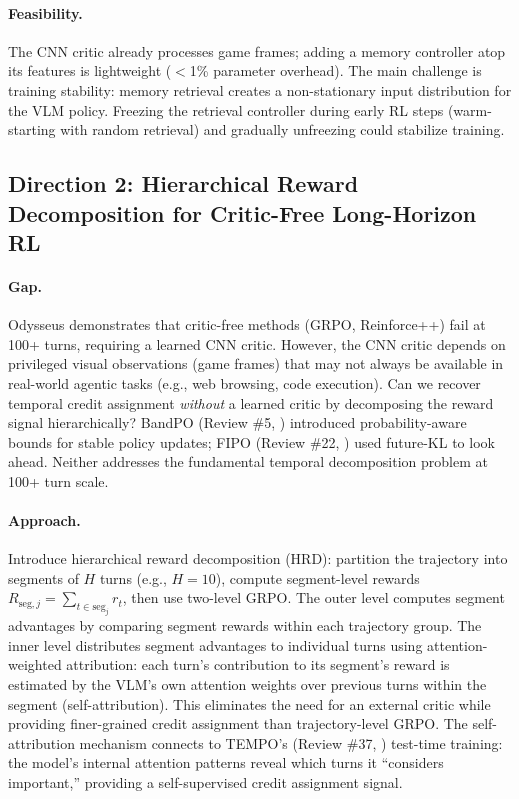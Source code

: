 \documentclass[11pt]{article}
\begin{document}
\paragraph{Feasibility.}
The CNN critic already processes game frames; adding a memory controller atop its features is lightweight ($<$1\% parameter overhead). The main challenge is training stability: memory retrieval creates a non-stationary input distribution for the VLM policy. Freezing the retrieval controller during early RL steps (warm-starting with random retrieval) and gradually unfreezing could stabilize training.

\subsection{Direction 2: Hierarchical Reward Decomposition for Critic-Free Long-Horizon RL}

\paragraph{Gap.}
Odysseus demonstrates that critic-free methods (GRPO, Reinforce++) fail at 100+ turns, requiring a learned CNN critic. However, the CNN critic depends on privileged visual observations (game frames) that may not always be available in real-world agentic tasks (e.g., web browsing, code execution). Can we recover temporal credit assignment \emph{without} a learned critic by decomposing the reward signal hierarchically? BandPO (Review \#5, \cite{bandpo}) introduced probability-aware bounds for stable policy updates; FIPO (Review \#22, \cite{fipo}) used future-KL to look ahead. Neither addresses the fundamental temporal decomposition problem at 100+ turn scale.

\paragraph{Approach.}
Introduce hierarchical reward decomposition (HRD): partition the trajectory into segments of $H$ turns (e.g., $H = 10$), compute segment-level rewards $R_{\mathrm{seg},j} = \sum_{t \in \mathrm{seg}_j} r_t$, then use two-level GRPO. The outer level computes segment advantages by comparing segment rewards within each trajectory group. The inner level distributes segment advantages to individual turns using attention-weighted attribution: each turn's contribution to its segment's reward is estimated by the VLM's own attention weights over previous turns within the segment (self-attribution). This eliminates the need for an external critic while providing finer-grained credit assignment than trajectory-level GRPO. The self-attribution mechanism connects to TEMPO's (Review \#37, \cite{tempo}) test-time training: the model's internal attention patterns reveal which turns it ``considers important,'' providing a self-supervised credit assignment signal.
\end{document}
